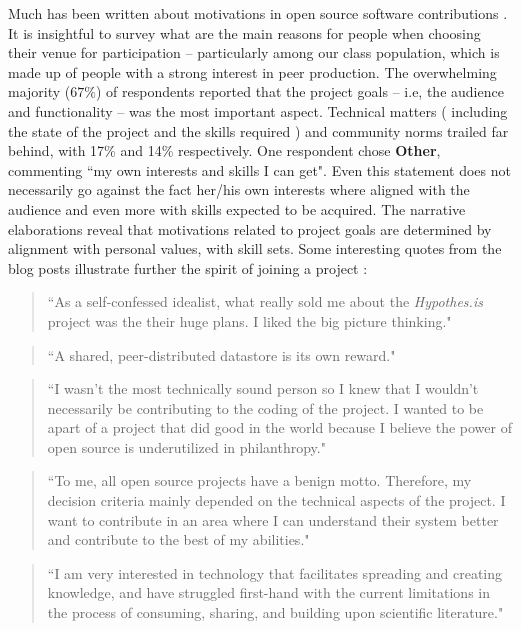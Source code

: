 Much has been written about motivations in open source software
contributions \cite{vonKrogh2012}. It is insightful to survey what are the main reasons 
for people when choosing their venue for participation -- particularly among
our class population, which is made up of people with a strong interest in peer production. 
The overwhelming majority ($67\%$) of respondents reported that the project goals -- i.e, the audience and functionality --  was the most important aspect. Technical matters ( including the state of the project and the
skills required ) and community norms trailed far behind, with 17\% and 14\%
respectively. One respondent chose {\bf Other}, commenting ``my own interests and skills I can get". Even this statement does not necessarily go against the fact her/his own interests where aligned with the audience and even more with skills expected to be acquired. The narrative elaborations reveal that motivations related to project goals are determined by alignment with personal values, with skill sets. Some interesting quotes from the blog posts illustrate further the spirit of joining a project :

\begin{quotation} 
``As a self-confessed idealist,  what really sold me about the {\it Hypothes.is} project was the their huge plans. I liked the big picture thinking."
\end{quotation}

\begin{quotation}
``A shared, peer-distributed datastore is its own reward."
\end{quotation}

\begin{quotation}
``I wasn't the most technically sound person so I knew that I wouldn't 
necessarily be contributing to the coding of the project. I wanted to be apart of a 
project that did good in the world because I believe the power of open source is 
underutilized in philanthropy."
\end{quotation}

\begin{quotation}
``To me, all open source projects have a benign motto. Therefore, my decision criteria mainly
 depended on the technical aspects of the project. I want to contribute in an area where I 
 can understand their system better and contribute to the best of my abilities."
 \end{quotation}

\begin{quotation}
``I am very interested in technology that facilitates spreading and creating knowledge, 
and have struggled first-hand with the current limitations in the process of consuming, 
sharing, and building upon scientific literature."
\end{quotation}

